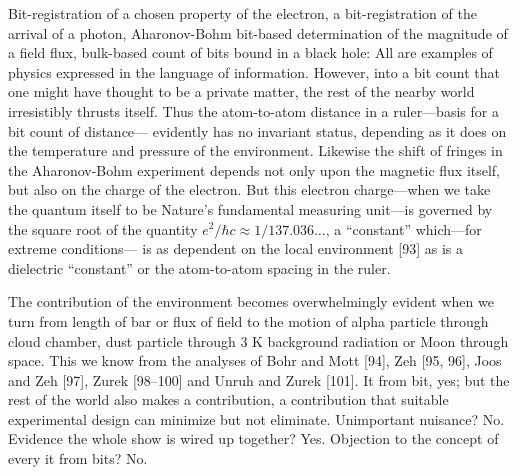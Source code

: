 \documentclass[11pt]{article}
\begin{document}
	Bit-registration of a chosen property of the electron, a bit-registration of the
	arrival of a photon, Aharonov-Bohm bit-based determination of the magnitude of a
	field flux, bulk-based count of bits bound in a black hole: All are examples of physics
	expressed in the language of information. However, into a bit count that one might
	have thought to be a private matter, the rest of the nearby world irresistibly thrusts
	itself. Thus the atom-to-atom distance in a ruler---basis for a bit count of distance---
	evidently has no invariant status, depending as it does on the temperature and
	pressure of the environment. Likewise the shift of fringes in the Aharonov-Bohm
	experiment depends not only upon the magnetic flux itself, but also on the charge
	of the electron. But this electron charge---when we take the quantum itself to
	be Nature's fundamental measuring unit---is governed by the square root of the
	quantity $e^2 / \hbar c \approx 1/137.036\ldots$, a ``constant'' which---for extreme conditions---
	is as dependent on the local environment [93] as is a dielectric ``constant'' or the
	atom-to-atom spacing in the ruler.
	
	The contribution of the environment becomes overwhelmingly evident when we
	turn from length of bar or flux of field to the motion of alpha particle through cloud
	chamber, dust particle through $3$ K background radiation or Moon through space.
	This we know from the analyses of Bohr and Mott [94], Zeh [95, 96], Joos and
	Zeh [97], Zurek [98--100] and Unruh and Zurek [101]. It from bit, yes; but the rest
	of the world also makes a contribution, a contribution that suitable experimental
	design can minimize but not eliminate. Unimportant nuisance? No. Evidence the
	whole show is wired up together? Yes. Objection to the concept of every it from
	bits? No.
	
\end{document}
